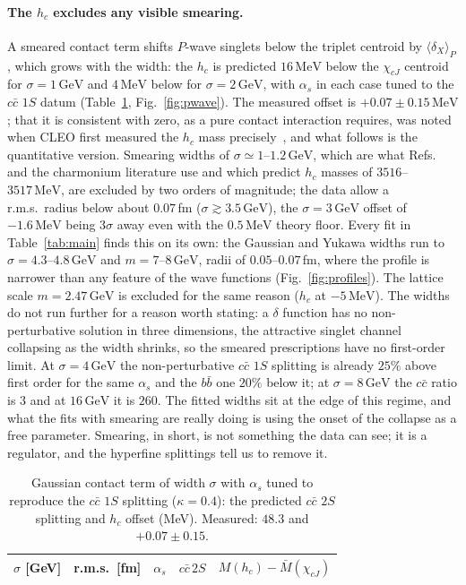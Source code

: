 \documentclass[10pt,twocolumn]{article}
\newcommand{\cc}{c\bar c}
\newcommand{\bb}{b\bar b}
\newcommand{\MeV}{\,\mathrm{MeV}}
\newcommand{\GeV}{\,\mathrm{GeV}}
\begin{document}
\paragraph{The $h_c$ excludes any visible smearing.}
A smeared contact term shifts $P$-wave singlets below the triplet centroid by $\langle\delta_X\rangle_{P}$, which grows with the width: the $h_c$ is predicted $16\MeV$ below the $\chi_{cJ}$ centroid for $\sigma=1\GeV$ and $4\MeV$ below for $\sigma=2\GeV$, with $\alpha_s$ in each case tuned to the $\cc$ $1S$ datum (Table~\ref{tab:pwave}, Fig.~\ref{fig:pwave}).
The measured offset is $+0.07\pm0.15\MeV$; that it is consistent with zero, as a pure contact interaction requires, was noted when CLEO first measured the $h_c$ mass precisely~\cite{CLEO2008}, and what follows is the quantitative version.
Smearing widths of $\sigma\simeq1$--$1.2\GeV$, which are what Refs.~\cite{BGS2005} and the charmonium literature use and which predict $h_c$ masses of $3516$--$3517\MeV$, are excluded by two orders of magnitude; the data allow a r.m.s.\ radius below about $0.07\,$fm ($\sigma\gtrsim3.5\GeV$), the $\sigma=3\GeV$ offset of $-1.6\MeV$ being $3\sigma$ away even with the $0.5\MeV$ theory floor.
Every fit in Table~\ref{tab:main} finds this on its own: the Gaussian and Yukawa widths run to $\sigma=4.3$--$4.8\GeV$ and $m=7$--$8\GeV$, radii of $0.05$--$0.07\,$fm, where the profile is narrower than any feature of the wave functions (Fig.~\ref{fig:profiles}).
The lattice scale $m=2.47\GeV$ is excluded for the same reason ($h_c$ at $-5\MeV$).
The widths do not run further for a reason worth stating: a $\delta$ function has no non-perturbative solution in three dimensions, the attractive singlet channel collapsing as the width shrinks, so the smeared prescriptions have no first-order limit.
At $\sigma=4\GeV$ the non-perturbative $\cc$ $1S$ splitting is already $25\%$ above first order for the same $\alpha_s$ and the $\bb$ one $20\%$ below it; at $\sigma=8\GeV$ the $\cc$ ratio is $3$ and at $16\GeV$ it is $260$.
The fitted widths sit at the edge of this regime, and what the fits with smearing are really doing is using the onset of the collapse as a free parameter.
Smearing, in short, is not something the data can see; it is a regulator, and the hyperfine splittings tell us to remove it.

\begin{table}[t]
\caption{Gaussian contact term of width $\sigma$ with $\alpha_s$ tuned to reproduce the $\cc$ $1S$ splitting ($\kappa=0.4$): the predicted $\cc$ $2S$ splitting and $h_c$ offset (MeV). Measured: $48.3$ and $+0.07\pm0.15$.}
\label{tab:pwave}
\centering\small
\begin{tabular}{ccccc}
\toprule
$\sigma$ [GeV] & r.m.s.\ [fm] & $\alpha_s$ & $c\bar c\,2S$ & $M(h_c)-\bar M(\chi_{cJ})$ \\
\midrule

\end{tabular}
\end{table}
\end{document}
